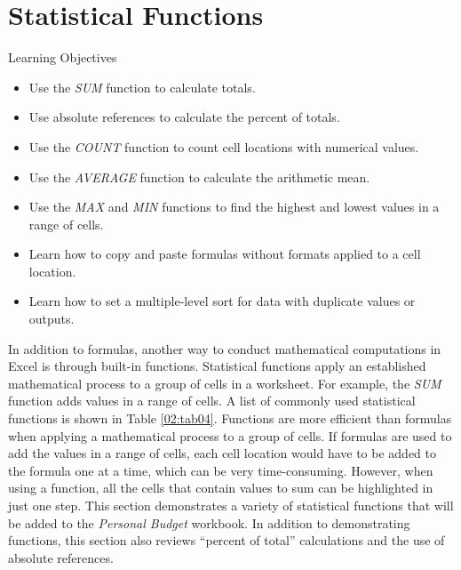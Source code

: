 \section{Statistical Functions}\label{ch02:statistical_functions}

\begin{center}
	\begin{objbox}{Learning Objectives}
		\begin{itemize}
			\setlength{\itemsep}{0pt}
			\setlength{\parskip}{0pt}
			\setlength{\parsep}{0pt}
			
			\item Use the \textit{SUM} function to calculate totals.
			\item Use absolute references to calculate the percent of totals.
			\item Use the \textit{COUNT} function to count cell locations with numerical values.
			\item Use the \textit{AVERAGE} function to calculate the arithmetic mean.
			\item Use the \textit{MAX} and \textit{MIN} functions to find the highest and lowest values in a range of cells.
			\item Learn how to copy and paste formulas without formats applied to a cell location.
			\item Learn how to set a multiple-level sort for data with duplicate values or outputs.
			
 		\end{itemize}
	\end{objbox}
\end{center}

In addition to formulas, another way to conduct mathematical computations in Excel is through built-in functions. Statistical functions apply an established mathematical process to a group of cells in a worksheet. For example, the \textit{SUM} function adds values in a range of cells. A list of commonly used statistical functions is shown in Table \ref{02:tab04}. Functions are more efficient than formulas when applying a mathematical process to a group of cells. If formulas are used to add the values in a range of cells, each cell location would have to be added to the formula one at a time, which can be very time-consuming. However, when using a function, all the cells that contain values to sum can be highlighted in just one step. This section demonstrates a variety of statistical functions that will be added to the \textit{Personal Budget} workbook. In addition to demonstrating functions, this section also reviews ``percent of total'' calculations and the use of absolute references.

